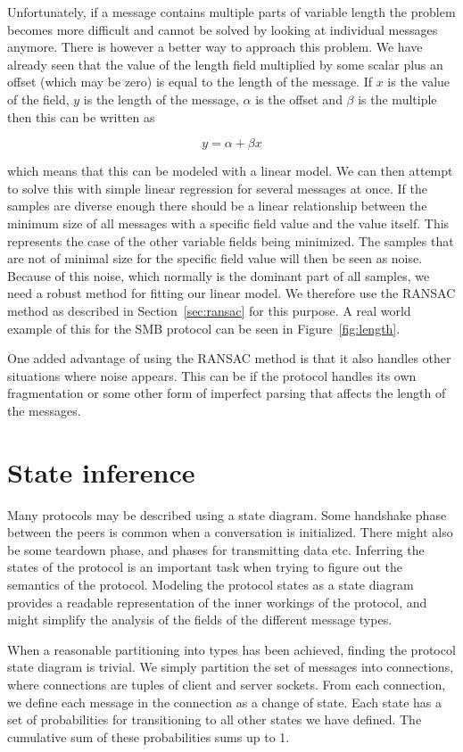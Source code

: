 \documentclass[a4paper]{report}
\begin{document}
Unfortunately, if a message contains multiple parts of variable length the
problem becomes more difficult and cannot be solved by looking at individual
messages anymore. There is however a better way to approach this problem. We
have already seen that the value of the length field multiplied by some scalar
plus an offset (which may be zero) is equal to the length of the message. If
$x$ is the value of the field, $y$ is the length of the message, $\alpha$ is the
offset and $\beta$ is the multiple then this can be written as

\[
    y = \alpha + \beta x
    \label{eq:linlength}
\]

which means that this can be modeled with a linear model. We can then attempt
to solve this with simple linear regression for several messages at once. If
the samples are diverse enough there should be a linear relationship between
the minimum size of all messages with a specific field value and the value
itself. This represents the case of the other variable fields being minimized.
The samples that are not of minimal size for the specific field value will then
be seen as noise. Because of this noise, which normally is the dominant part of
all samples, we need a robust method for fitting our linear model. We therefore
use the RANSAC method as described in Section~\ref{sec:ransac} for this
purpose. A real world example of this for the SMB protocol can be seen in
Figure~\ref{fig:length}.

One added advantage of using the RANSAC method is that it also handles other
situations where noise appears. This can be if the protocol handles its own
fragmentation or some other form of imperfect parsing that affects the length
of the messages.

\section{State inference}
Many protocols may be described using a state diagram. Some handshake phase
between the peers is common when a conversation is initialized. There might
also be some teardown phase, and phases for transmitting data etc.
Inferring the states of the protocol is an important task when trying to
figure out the semantics of the protocol. Modeling the protocol states as
a state diagram provides a readable representation of the inner workings
of the protocol, and might simplify the analysis of the fields of the
different message types.

When a reasonable partitioning into types has been achieved, finding the
protocol state diagram is trivial. We simply partition the set of messages
into connections, where connections are tuples of client and server sockets.
From each connection, we define each message in the connection as a change
of state. Each state has a set of probabilities for transitioning to
all other states we have defined. The cumulative sum of these probabilities
sums up to 1.
\end{document}
